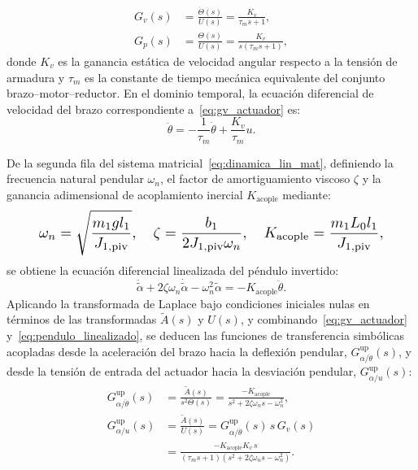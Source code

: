\begin{equation}
    \begin{aligned}
        G_v(s) &= \frac{\dot{\Theta}(s)}{U(s)} = \frac{K_v}{\tau_m s + 1}, \\
        G_p(s) &= \frac{\Theta(s)}{U(s)} = \frac{K_v}{s(\tau_m s + 1)},
    \end{aligned}
    \label{eq:gv_actuador}
\end{equation}
donde $K_v$ es la ganancia estática de velocidad angular respecto a la tensión de armadura y $\tau_m$ es la constante de tiempo mecánica equivalente del conjunto brazo--motor--reductor. En el dominio temporal, la ecuación diferencial de velocidad del brazo correspondiente a~\eqref{eq:gv_actuador} es:
\begin{equation}
    \ddot{\theta} = -\frac{1}{\tau_m}\dot{\theta} + \frac{K_v}{\tau_m}u.
    \label{eq:edo_brazo}
\end{equation}

De la segunda fila del sistema matricial~\eqref{eq:dinamica_lin_mat}, definiendo la frecuencia natural pendular $\omega_n$, el factor de amortiguamiento viscoso $\zeta$ y la ganancia adimensional de acoplamiento inercial $K_{\text{acople}}$ mediante:
\begin{equation}
\resizebox{0.88\columnwidth}{!}{$\displaystyle
    \omega_n = \sqrt{\frac{m_1 g l_1}{J_{1,\text{piv}}}}, \quad
    \zeta = \frac{b_1}{2 J_{1,\text{piv}}\omega_n}, \quad
    K_{\text{acople}} = \frac{m_1 L_0 l_1}{J_{1,\text{piv}}},
$}
    \label{eq:params_pendulo_simb}
\end{equation}
se obtiene la ecuación diferencial linealizada del péndulo invertido:
\begin{equation}
    \ddot{\tilde{\alpha}} + 2\zeta\omega_n\dot{\tilde{\alpha}} - \omega_n^2\tilde{\alpha} = -K_{\text{acople}}\ddot{\theta}.
    \label{eq:pendulo_linealizado}
\end{equation}
Aplicando la transformada de Laplace bajo condiciones iniciales nulas en términos de las transformadas $\tilde{A}(s)$ y $U(s)$, y combinando~\eqref{eq:gv_actuador} y~\eqref{eq:pendulo_linealizado}, se deducen las funciones de transferencia simbólicas acopladas desde la aceleración del brazo hacia la deflexión pendular, $G_{\alpha/\ddot{\theta}}^{\text{up}}(s)$, y desde la tensión de entrada del actuador hacia la desviación pendular, $G_{\alpha/u}^{\text{up}}(s)$:
\begin{equation}
    \begin{aligned}
        G_{\alpha/\ddot{\theta}}^{\text{up}}(s) &= \frac{\tilde{A}(s)}{s^2\Theta(s)} = \frac{-K_{\text{acople}}}{s^2 + 2\zeta\omega_n s - \omega_n^2}, \\[3pt]
        G_{\alpha/u}^{\text{up}}(s) &= \frac{\tilde{A}(s)}{U(s)} = G_{\alpha/\ddot{\theta}}^{\text{up}}(s)\,s\,G_v(s) \\
        &= \frac{-K_{\text{acople}} K_v\,s}{(\tau_m s + 1)(s^2 + 2\zeta\omega_n s - \omega_n^2)}.
    \end{aligned}
    \label{eq:ft_pendulo_up}
\end{equation}

